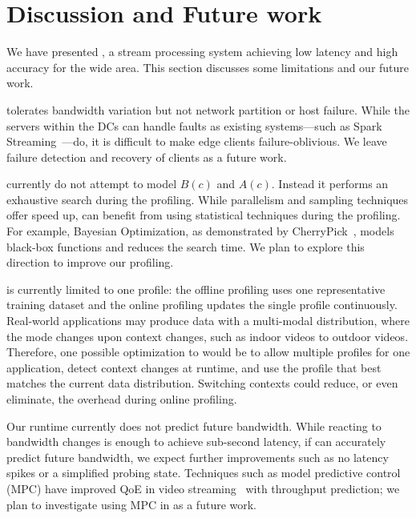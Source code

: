 \section{Discussion and Future work}
\label{sec:discussion}

We have presented \sysname{}, a stream processing system achieving low latency
and high accuracy for the wide area. This section discusses some limitations and
our future work.

 \sysname{} tolerates bandwidth
variation but not network partition or host failure. While the servers within
the DCs can handle faults as existing systems---such as Spark
Streaming~\cite{zaharia2013discretized}---do, it is difficult to make edge clients failure-oblivious.
We leave failure detection and recovery of clients as a future work.

 \sysname{} currently do not attempt to model $B(c)$
and $A(c)$. Instead it performs an exhaustive search during the profiling. While
parallelism and sampling techniques offer speed up, \sysname{} can benefit from
using statistical techniques during the profiling. For example, Bayesian
Optimization, as demonstrated by CherryPick~\cite{alipourfard2017cherrypick},
models black-box functions and reduces the search time. We plan to explore this
direction to improve our profiling.


 \sysname{} is currently limited to one profile:
the offline profiling uses one representative training dataset and the online profiling updates the single profile continuously.
Real-world applications may produce data with a multi-modal
distribution, where the mode changes upon context changes, such as indoor videos
to outdoor videos. Therefore, one possible optimization to \sysname{} would be to allow multiple profiles
for one application, detect context changes at runtime, and use the profile that
best matches the current data distribution.
Switching contexts could reduce, or even eliminate, the overhead during online profiling.

 Our runtime currently does not
predict future bandwidth. While reacting to bandwidth changes is enough to
achieve sub-second latency, if \sysname{} can accurately predict future
bandwidth, we expect further improvements such as no latency spikes or a
simplified probing state. Techniques such as model predictive control (MPC) have
improved QoE in video streaming~\cite{yin2015control} with throughput
prediction; we plan to investigate using MPC in \sysname{} as a future work.

